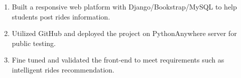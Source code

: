 \begin{enumerate}

\item{Built a responsive web platform with Django/Bookstrap/MySQL to help students post rides information.}
 
 
\item{ Utilized GitHub and deployed the project on PythonAnywhere server for public testing.}

\item{ Fine tuned and validated the front-end to meet requirements such as intelligent rides recommendation. }
 
 
\end{enumerate}